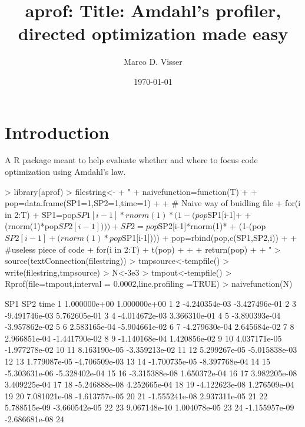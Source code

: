 \documentclass{article}
\begin{document}

\title{aprof: Title: Amdahl's profiler, directed optimization made easy}
\date{\today}
\author{Marco D. Visser}
\maketitle

\section{Introduction}

A R package meant to help evaluate whether and where to focus 
code optimization using Amdahl's law.

\begin{Schunk}
\begin{Sinput}
> library(aprof)
> filestring<-
+ "
+ naivefunction=function(T){
+ 
+ pop=data.frame(SP1=1,SP2=1,time=1)
+ 
+ # Naive way of buidling file
+ for(i in 2:T){
+ 	SP1=pop$SP1[i-1]*rnorm(1)*(1-(pop$SP1[i-1]+
+ 	(rnorm(1)*pop$SP2[i-1])))
+ 	SP2=pop$SP2[i-1]*rnorm(1)*
+ 	(1-(pop$SP2[i-1]+(rnorm(1)*pop$SP1[i-1])))
+ 	pop=rbind(pop,c(SP1,SP2,i))
+ }
+ #useless piece of code
+ for(i in 2:T){
+ t(pop)
+ }
+ 
+ return(pop)
+ }
+ "
> source(textConnection(filestring))
> tmpsource<-tempfile()
> write(filestring,tmpsource)
> N<-3e3
> tmpout<-tempfile()
> Rprof(file=tmpout,interval = 0.0002,line.profiling =TRUE)
> naivefunction(N)
\end{Sinput}
\begin{Soutput}
                SP1            SP2 time
1      1.000000e+00   1.000000e+00    1
2     -4.240354e-03  -3.427496e-01    2
3     -9.491746e-03   5.762605e-01    3
4     -4.014672e-03   3.366310e-01    4
5     -3.890393e-04  -3.957862e-02    5
6      2.583165e-04  -5.904661e-02    6
7     -4.279630e-04   2.645684e-02    7
8      2.966851e-04  -1.441790e-02    8
9     -1.140168e-04   1.420856e-02    9
10     4.037171e-05  -1.977278e-02   10
11     8.163190e-05  -3.359213e-02   11
12     5.299267e-05  -5.015838e-03   12
13     1.779087e-05  -4.706509e-03   13
14    -1.700735e-05  -8.397768e-04   14
15    -5.303631e-06  -5.328402e-04   15
16    -3.315388e-08   1.650372e-04   16
17     3.982205e-08   3.409225e-04   17
18    -5.246888e-08   4.252665e-04   18
19    -4.122623e-08   1.276509e-04   19
20     7.081021e-08  -1.613757e-05   20
21    -1.555241e-08   2.937311e-05   21
22     5.788515e-09  -3.660542e-05   22
23     9.067148e-10   1.004078e-05   23
24    -1.155957e-09  -2.686681e-08   24

\end{Soutput}
\end{Schunk}
\end{document}
